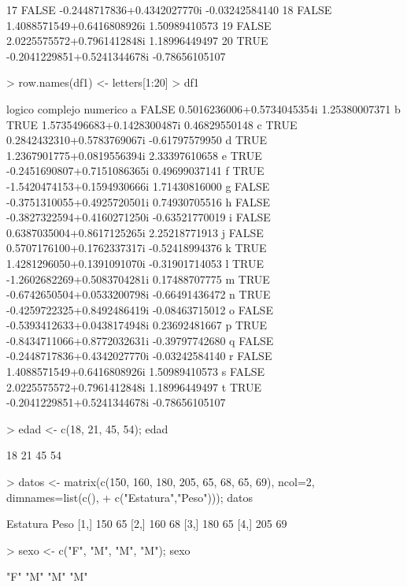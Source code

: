 \documentclass{article}
\begin{document}
\begin{Schunk}
\begin{Soutput}
17  FALSE -0.2448717836+0.4342027770i -0.03242584140
18  FALSE  1.4088571549+0.6416808926i  1.50989410573
19  FALSE  2.0225575572+0.7961412848i  1.18996449497
20   TRUE -0.2041229851+0.5241344678i -0.78656105107
\end{Soutput}
\begin{Sinput}
> row.names(df1) <- letters[1:20]
> df1
\end{Sinput}
\begin{Soutput}
  logico                    complejo       numerico
a  FALSE  0.5016236006+0.5734045354i  1.25380007371
b   TRUE  1.5735496683+0.1428300487i  0.46829550148
c   TRUE  0.2842432310+0.5783769067i -0.61797579950
d   TRUE  1.2367901775+0.0819556394i  2.33397610658
e   TRUE -0.2451690807+0.7151086365i  0.49699037141
f   TRUE -1.5420474153+0.1594930666i  1.71430816000
g  FALSE -0.3751310055+0.4925720501i  0.74930705516
h  FALSE -0.3827322594+0.4160271250i -0.63521770019
i  FALSE  0.6387035004+0.8617125265i  2.25218771913
j  FALSE  0.5707176100+0.1762337317i -0.52418994376
k   TRUE  1.4281296050+0.1391091070i -0.31901714053
l   TRUE -1.2602682269+0.5083704281i  0.17488707775
m   TRUE -0.6742650504+0.0533200798i -0.66491436472
n   TRUE -0.4259722325+0.8492486419i -0.08463715012
o  FALSE -0.5393412633+0.0438174948i  0.23692481667
p   TRUE -0.8434711066+0.8772032631i -0.39797742680
q  FALSE -0.2448717836+0.4342027770i -0.03242584140
r  FALSE  1.4088571549+0.6416808926i  1.50989410573
s  FALSE  2.0225575572+0.7961412848i  1.18996449497
t   TRUE -0.2041229851+0.5241344678i -0.78656105107
\end{Soutput}
\begin{Sinput}
> edad <- c(18, 21, 45, 54); edad
\end{Sinput}
\begin{Soutput}
[1] 18 21 45 54
\end{Soutput}
\begin{Sinput}
> datos <- matrix(c(150, 160, 180, 205, 65, 68, 65, 69), ncol=2, dimnames=list(c(),
+                                                                              c("Estatura","Peso"))); datos
\end{Sinput}
\begin{Soutput}
     Estatura Peso
[1,]      150   65
[2,]      160   68
[3,]      180   65
[4,]      205   69
\end{Soutput}
\begin{Sinput}
> sexo <- c("F", "M", "M", "M"); sexo
\end{Sinput}
\begin{Soutput}
[1] "F" "M" "M" "M"

\end{Soutput}
\end{Schunk}
\end{document}
